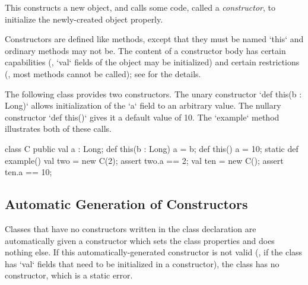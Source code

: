 This constructs a new object, and calls some code, called a {\em constructor},
to initialize the newly-created object properly.

Constructors are defined like methods, except that they must be named \xcd`this`
and ordinary methods may not be.    The content of a constructor body has
certain capabilities (\eg, \xcd`val` fields of the object may be initialized)
and certain restrictions (\eg, most methods cannot be called); see
 for the details.

\begin{ex}

The following class provides two constructors.  The unary constructor 
\xcd`def this(b : Long)` allows initialization of the \xcd`a` field to an 
arbitrary value.  The nullary constructor \xcd`def this()` gives it a default
value of 10.  The \xcd`example` method illustrates both of these calls.


\begin{xten}
class C {
  public val a : Long;
  def this(b : Long) { a = b; } 
  def this()        { a = 10; }
  static def example() {
     val two = new C(2);
     assert two.a == 2;
     val ten = new C(); 
     assert ten.a == 10;
  }
}
\end{xten}
\end{ex}


\subsection{Automatic Generation of Constructors}

Classes that have no constructors written in the class declaration are
automatically given a constructor which sets the class properties and does
nothing else. If this automatically-generated constructor is not valid (\eg,
if the class has \xcd`val` fields that need to be initialized in a
constructor), the class has no constructor, which is a static error.

